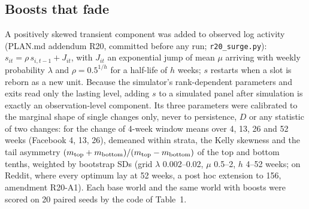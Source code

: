 \documentclass[10pt]{article}
\begin{document}
\subsection{Boosts that fade}\label{sec:boosts}
A positively skewed transient component was added to observed log activity (PLAN.md addendum R20, committed before any run; \texttt{r20\_surge.py}): $s_{it} = \rho\, s_{i,t-1} + J_{it}$, with $J_{it}$ an exponential jump of mean $\mu$ arriving with weekly probability $\lambda$ and $\rho = 0.5^{1/h}$ for a half-life of $h$ weeks; $s$ restarts when a slot is reborn as a new unit. Because the simulator's rank-dependent parameters and exits read only the lasting level, adding $s$ to a simulated panel after simulation is exactly an observation-level component. Its three parameters were calibrated to the marginal shape of single changes only, never to persistence, $D$ or any statistic of two changes: for the change of 4-week window means over 4, 13, 26 and 52 weeks (Facebook 4, 13, 26), demeaned within strata, the Kelly skewness and the tail asymmetry $(m_{\rm top}+m_{\rm bottom})/(m_{\rm top}-m_{\rm bottom})$ of the top and bottom tenths, weighted by bootstrap SDs (grid $\lambda$ 0.002--0.02, $\mu$ 0.5--2, $h$ 4--52 weeks; on Reddit, where every optimum lay at 52 weeks, a post hoc extension to 156, amendment R20-A1). Each base world and the same world with boosts were scored on 20 paired seeds by the code of Table~1.
\end{document}
